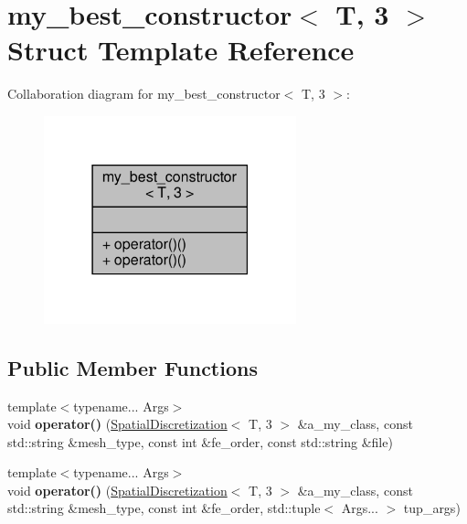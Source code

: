 \hypertarget{structmy__best__constructor_3_01T_00_013_01_4}{}\section{my\+\_\+best\+\_\+constructor$<$ T, 3 $>$ Struct Template Reference}
\label{structmy__best__constructor_3_01T_00_013_01_4}


Collaboration diagram for my\+\_\+best\+\_\+constructor$<$ T, 3 $>$\+:\nopagebreak
\begin{figure}[H]
\begin{center}
\leavevmode
\includegraphics[width=207pt]{structmy__best__constructor_3_01T_00_013_01_4__coll__graph}
\end{center}
\end{figure}
\subsection*{Public Member Functions}
\begin{DoxyCompactItemize}
\item 
\mbox{\label{structmy__best__constructor_3_01T_00_013_01_4_a9d8d5e6486fad7478ab360b8a2d3348a}} 
{\footnotesize template$<$typename... Args$>$ }\\void {\bfseries operator()} (\hyperlink{classSpatialDiscretization}{Spatial\+Discretization}$<$ T, 3 $>$ \&a\+\_\+my\+\_\+class, const std\+::string \&mesh\+\_\+type, const int \&fe\+\_\+order, const std\+::string \&file)
\item 
\mbox{\label{structmy__best__constructor_3_01T_00_013_01_4_ab87e980a10bde0f683165711356d2c22}} 
{\footnotesize template$<$typename... Args$>$ }\\void {\bfseries operator()} (\hyperlink{classSpatialDiscretization}{Spatial\+Discretization}$<$ T, 3 $>$ \&a\+\_\+my\+\_\+class, const std\+::string \&mesh\+\_\+type, const int \&fe\+\_\+order, std\+::tuple$<$ Args... $>$ tup\+\_\+args)
\end{DoxyCompactItemize}


